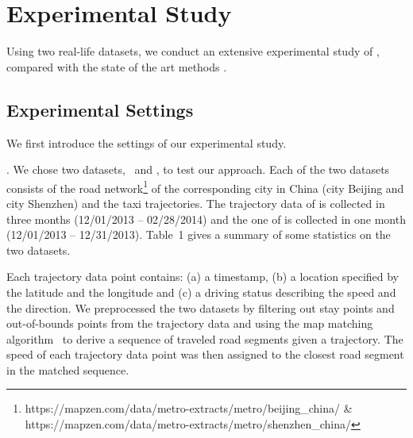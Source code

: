 \section{Experimental Study}
\label{sec-exp}

Using two real-life datasets, we conduct an extensive experimental study of , compared with the state of the art methods .


\subsection{Experimental Settings}

We first introduce the settings of our experimental study.

. We chose two datasets, \ie~\beijing and \shenzhen,  to test our approach.
%
Each of the two datasets consists of the road network\footnote{https://mapzen.com/data/metro-extracts/metro/beijing\_china/ \& https://mapzen.com/data/metro-extracts/metro/shenzhen\_china/} of the corresponding city in China (\ie city Beijing and city Shenzhen) and the taxi trajectories. The trajectory data of \beijing is collected in three months (12/01/2013 -- 02/28/2014) and the one of \shenzhen is collected in one month (12/01/2013 -- 12/31/2013). Table~1 gives a summary of some statistics on the two datasets.

Each trajectory data point contains: (a) a timestamp, (b) a location specified by the latitude and the longitude and (c) a driving status describing the speed and the direction. We preprocessed the two datasets by filtering out stay points and out-of-bounds points from the trajectory data and using the map matching algorithm~\cite{Newson2009MM} to derive a sequence of traveled road segments given a trajectory. The speed of each trajectory data point was then assigned to the closest road segment in the matched sequence.




